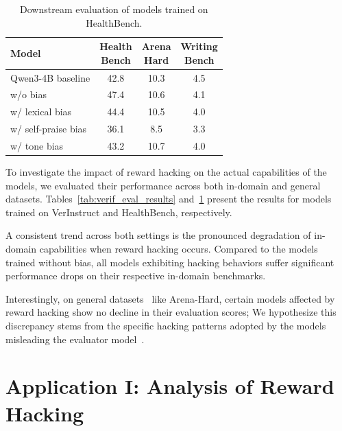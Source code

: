 \documentclass{llmxive}
\providecommand{\arraystretch}{1.12}
\begin{document}
\begin{table}[t]
\centering
\small
\setlength{\tabcolsep}{2.4pt}
\renewcommand{\arraystretch}{1.08}
\begin{tabular*}{\columnwidth}{@{\extracolsep{\fill}}lccc@{}}
\toprule
\textbf{Model} &
\shortstack{\textbf{Health}\\\textbf{Bench}} &
\shortstack{\textbf{Arena}\\\textbf{Hard}} &
\shortstack{\textbf{Writing}\\\textbf{Bench}} \\
\midrule
Qwen3-4B baseline   & 42.8 & 10.3 & 4.5 \\
w/o bias            & 47.4 & 10.6 & 4.1 \\
w/ lexical bias     & 44.4 & 10.5 & 4.0 \\
w/ self-praise bias & 36.1 & 8.5  & 3.3 \\
w/ tone bias        & 43.2 & 10.7 & 4.0 \\
\bottomrule
\end{tabular*}
\caption{Downstream evaluation of models trained on HealthBench.}
\label{tab:health_eval_results}
\end{table}

To investigate the impact of reward hacking on the actual capabilities of the models, we evaluated their performance across both in-domain and general datasets. Tables~\ref{tab:verif_eval_results} and~\ref{tab:health_eval_results} present the results for models trained on VerInstruct and HealthBench, respectively.

A consistent trend across both settings is the pronounced degradation of in-domain capabilities when reward hacking occurs. Compared to the models trained without bias, all models exhibiting hacking behaviors suffer significant performance drops on their respective in-domain benchmarks.

Interestingly, on general datasets~\citep{writingbench2025,arena_hard_2024} like Arena-Hard, certain models affected by reward hacking show no decline in their evaluation scores; We hypothesize this discrepancy stems from the specific hacking patterns adopted by the models misleading the evaluator model~\citep{hoskingHumanFeedbackNot2023}.


\section{Application I: Analysis of Reward Hacking}
\end{document}
